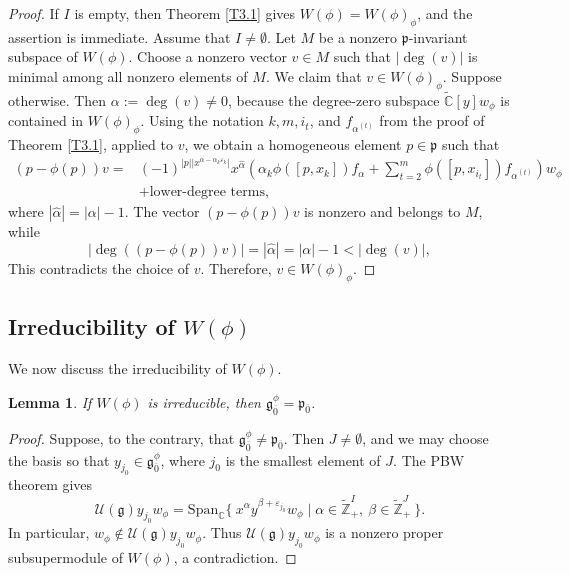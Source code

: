 \documentclass[12pt,reqno]{article}
\newtheorem{lem}[thm]{Lemma}
\def\o{\overline}
\def\a{\alpha}
\def\b{\beta}
\def\F{\mathfrak}
\def\r{\mathrm}
\def\C{\mathcal}
\def\CC{\mathbb{C}}
\def\ZZ{\mathbb{Z}}
\def\beqn{\begin{equation*}}
\def\eeqn{\end{equation*}}
\begin{document}
\begin{proof}
If $I$ is empty, then Theorem \ref{T3.1} gives $W(\phi)=W(\phi)_\phi$, and the assertion is immediate. 
Assume that $I\neq\emptyset$. Let $M$ be a nonzero $\F{p}$-invariant subspace of $W(\phi)$. Choose a nonzero vector $v\in M$ such that $|\deg(v)|$ is minimal among all nonzero elements of $M$. We claim that $v\in W(\phi)_\phi$. Suppose otherwise. Then $\a:=\deg(v)\neq0$, because the degree-zero subspace $\widetilde{\CC}[y]w_\phi$ is contained in $W(\phi)_\phi$. Using the notation $k,m,i_t$, and $f_{\a^{(t)}}$ from the proof of Theorem \ref{T3.1}, applied to $v$, we obtain a homogeneous element $p\in\F{p}$ such that
\beqn
\begin{aligned}
(p-\phi(p))v
={}&(-1)^{|p|\left|x^{\a-\a_k\varepsilon_k}\right|}x^{\hat\a}
\left(\a_k\phi([p,x_k])f_\a
+\sum_{t=2}^m\phi([p,x_{i_t}])f_{\a^{(t)}}\right)w_\phi\\
&+\text{lower-degree terms},
\end{aligned}
\eeqn
where $|\hat\a|=|\a|-1$. The vector $(p-\phi(p))v$ is nonzero and belongs to $M$, while
\beqn
|\deg((p-\phi(p))v)|=|\hat{\a}|=|\a|-1<|\deg(v)|,
\eeqn
This contradicts the choice of $v$. Therefore, $v\in W(\phi)_\phi$.
\end{proof}

\subsection{Irreducibility of $W(\phi)$}

We now discuss the irreducibility of $W(\phi)$.

\begin{lem}\label{L3.3}
If $W(\phi)$ is irreducible, then $\F{g}^\phi_{\o{0}}=\F{p}_{\o{0}}$.
\end{lem}

\begin{proof}
Suppose, to the contrary, that $\F{g}^\phi_{\o{0}}\neq\F{p}_{\o{0}}$. Then $J\neq\emptyset$, and we may choose the basis so that $y_{j_0}\in\F{g}^\phi_{\o{0}}$, where $j_0$ is the smallest element of $J$. The PBW theorem gives
	  \beqn
	  \C{U}(\F{g})y_{j_0}w_{\phi}=\r{Span}_{\CC}\{~x^\a y^{\b+\varepsilon_{j_0}}w_\phi\mid \a\in \widetilde{\ZZ}_+^I,~\b\in \widetilde{\ZZ}_+^J~\}.
	  \eeqn 
In particular, $w_\phi\notin\C{U}(\F{g})y_{j_0}w_{\phi}$. Thus $\C{U}(\F{g})y_{j_0}w_{\phi}$ is a nonzero proper subsupermodule of $W(\phi)$, a contradiction.
\end{proof}
\end{document}
